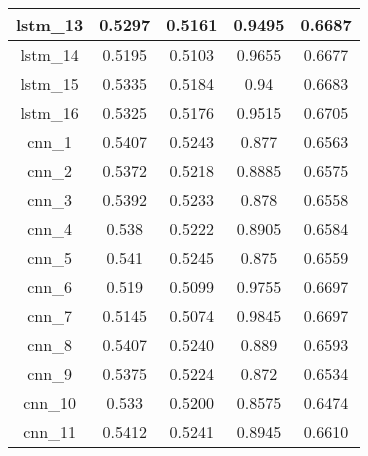 \begin{table}[h]
\begin{tabular}{|c|c|c|c|c|}
        lstm\_13 & 0.5297                       & 0.5161      & 0.9495 & 0.6687 \\ \hline
        lstm\_14 & 0.5195                       & 0.5103      & 0.9655 & 0.6677 \\ \hline
        lstm\_15 & 0.5335                       & 0.5184      & 0.94   & 0.6683 \\ \hline
        lstm\_16 & 0.5325                       & 0.5176      & 0.9515 & 0.6705 \\ \hline
        cnn\_1   & 0.5407                       & 0.5243      & 0.877  & 0.6563 \\ \hline
        cnn\_2   & 0.5372                       & 0.5218      & 0.8885 & 0.6575 \\ \hline
        cnn\_3   & 0.5392                       & 0.5233      & 0.878  & 0.6558 \\ \hline
        cnn\_4   & 0.538                        & 0.5222      & 0.8905 & 0.6584 \\ \hline
        cnn\_5   & 0.541                        & 0.5245      & 0.875  & 0.6559 \\ \hline
        cnn\_6   & 0.519                        & 0.5099      & 0.9755 & 0.6697 \\ \hline
        cnn\_7   & 0.5145                       & 0.5074      & 0.9845 & 0.6697 \\ \hline
        cnn\_8   & 0.5407                       & 0.5240      & 0.889  & 0.6593 \\ \hline
        cnn\_9   & 0.5375                       & 0.5224      & 0.872  & 0.6534 \\ \hline
        cnn\_10  & 0.533                        & 0.5200      & 0.8575 & 0.6474 \\ \hline
        cnn\_11  & 0.5412                       & 0.5241      & 0.8945 & 0.6610 \\ \hline
    \end{tabular}
\end{table}


